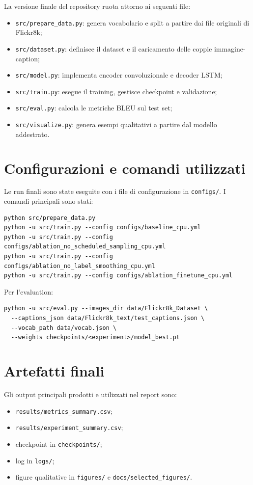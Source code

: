 \documentclass[11pt,a4paper]{report}
\begin{document}
La versione finale del repository ruota attorno ai seguenti file:
\begin{itemize}[leftmargin=*]
  \item \texttt{src/prepare\_data.py}: genera vocabolario e split a partire dai file originali di Flickr8k;
  \item \texttt{src/dataset.py}: definisce il dataset e il caricamento delle coppie immagine-caption;
  \item \texttt{src/model.py}: implementa encoder convoluzionale e decoder LSTM;
  \item \texttt{src/train.py}: esegue il training, gestisce checkpoint e validazione;
  \item \texttt{src/eval.py}: calcola le metriche BLEU sul test set;
  \item \texttt{src/visualize.py}: genera esempi qualitativi a partire dal modello addestrato.
\end{itemize}

\section{Configurazioni e comandi utilizzati}

Le run finali sono state eseguite con i file di configurazione in \texttt{configs/}. I comandi principali sono stati:

\begin{verbatim}
python src/prepare_data.py
python -u src/train.py --config configs/baseline_cpu.yml
python -u src/train.py --config configs/ablation_no_scheduled_sampling_cpu.yml
python -u src/train.py --config configs/ablation_no_label_smoothing_cpu.yml
python -u src/train.py --config configs/ablation_finetune_cpu.yml
\end{verbatim}

Per l'evaluation:

\begin{verbatim}
python -u src/eval.py --images_dir data/Flickr8k_Dataset \
  --captions_json data/Flickr8k_text/test_captions.json \
  --vocab_path data/vocab.json \
  --weights checkpoints/<experiment>/model_best.pt
\end{verbatim}

\section{Artefatti finali}

Gli output principali prodotti e utilizzati nel report sono:
\begin{itemize}[leftmargin=*]
  \item \texttt{results/metrics\_summary.csv};
  \item \texttt{results/experiment\_summary.csv};
  \item checkpoint in \texttt{checkpoints/};
  \item log in \texttt{logs/};
  \item figure qualitative in \texttt{figures/} e \texttt{docs/selected\_figures/}.
\end{itemize}
\end{document}
